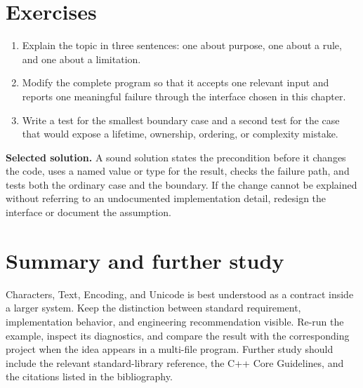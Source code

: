 \section{Exercises}
\begin{enumerate}
  \item Explain the topic in three sentences: one about purpose, one about a rule, and one about a limitation.
  \item Modify the complete program so that it accepts one relevant input and reports one meaningful failure through the interface chosen in this chapter.
  \item Write a test for the smallest boundary case and a second test for the case that would expose a lifetime, ownership, ordering, or complexity mistake.
\end{enumerate}

\textbf{Selected solution.} A sound solution states the precondition before it changes the code, uses a named value or type for the result, checks the failure path, and tests both the ordinary case and the boundary. If the change cannot be explained without referring to an undocumented implementation detail, redesign the interface or document the assumption.

\section{Summary and further study}
Characters, Text, Encoding, and Unicode is best understood as a contract inside a larger system. Keep the distinction between standard requirement, implementation behavior, and engineering recommendation visible. Re-run the example, inspect its diagnostics, and compare the result with the corresponding project when the idea appears in a multi-file program. Further study should include the relevant standard-library reference, the C++ Core Guidelines, and the citations listed in the bibliography.

